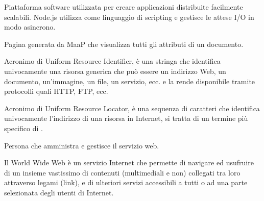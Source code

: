 
	Piattaforma software utilizzata per creare applicazioni distribuite facilmente scalabili.
	Node.js utilizza  come linguaggio di scripting e gestisce le attese I/O in modo asincrono.


	Pagina generata da MaaP che visualizza tutti gli attributi di un documento.


	Acronimo di Uniform Resource Identifier, è una stringa che identifica univocamente una risorsa generica che può essere un indirizzo Web, un documento, un'immagine, un file, un servizio, ecc. e la rende disponibile tramite protocolli quali HTTP, FTP, ecc.

	Acronimo di Uniform Resource Locator,  è una sequenza di caratteri che identifica univocamente l'indirizzo di una risorsa in Internet, si tratta di un termine più specifico di .


	Persona che amministra e gestisce il servizio web.
	
	Il World Wide Web è un servizio Internet che permette di navigare ed usufruire di un insieme vastissimo di contenuti (multimediali e non) collegati tra loro attraverso legami (link), e di ulteriori servizi accessibili a tutti o ad una parte selezionata degli utenti di Internet.


